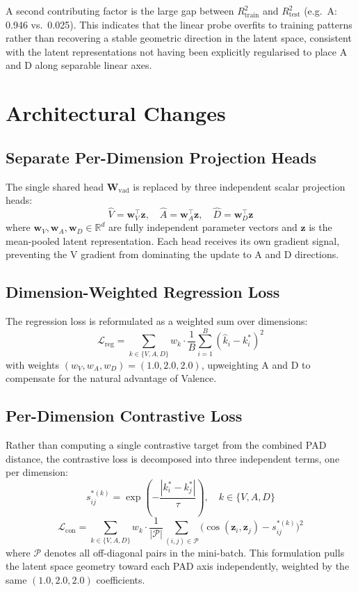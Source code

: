 \documentclass[12pt,twoside]{report}
\begin{document}
A second contributing factor is the large gap between $R^2_{\text{train}}$ and $R^2_{\text{test}}$ (e.g.\ A: 0.946 vs.\ 0.025).
This indicates that the linear probe overfits to training patterns rather than recovering a stable geometric direction in the latent space, consistent with the latent representations not having been explicitly regularised to place A and D along separable linear axes.

\section{Architectural Changes}

\subsection{Separate Per-Dimension Projection Heads}

The single shared head $\mathbf{W}_{\text{vad}}$ is replaced by three independent scalar projection heads:
\[
    \hat{V} = \mathbf{w}_V^\top \mathbf{z}, \quad
    \hat{A} = \mathbf{w}_A^\top \mathbf{z}, \quad
    \hat{D} = \mathbf{w}_D^\top \mathbf{z}
\]
where $\mathbf{w}_V, \mathbf{w}_A, \mathbf{w}_D \in \mathbb{R}^d$ are fully independent parameter vectors and $\mathbf{z}$ is the mean-pooled latent representation.
Each head receives its own gradient signal, preventing the V gradient from dominating the update to A and D directions.

\subsection{Dimension-Weighted Regression Loss}

The regression loss is reformulated as a weighted sum over dimensions:
\[
    \mathcal{L}_{\text{reg}} = \sum_{k \in \{V, A, D\}} w_k \cdot \frac{1}{B}\sum_{i=1}^{B}(\hat{k}_i - k_i^*)^2
\]
with weights $(w_V, w_A, w_D) = (1.0, 2.0, 2.0)$, upweighting A and D to compensate for the natural advantage of Valence.

\subsection{Per-Dimension Contrastive Loss}

Rather than computing a single contrastive target from the combined PAD distance, the contrastive loss is decomposed into three independent terms, one per dimension:
\[
    s_{ij}^{*(k)} = \exp\!\left(-\frac{|k_i^* - k_j^*|}{\tau}\right), \quad k \in \{V, A, D\}
\]
\[
    \mathcal{L}_{\text{con}} = \sum_{k \in \{V, A, D\}} w_k \cdot \frac{1}{|\mathcal{P}|}\sum_{(i,j) \in \mathcal{P}} \bigl(\cos(\mathbf{z}_i, \mathbf{z}_j) - s_{ij}^{*(k)}\bigr)^2
\]
where $\mathcal{P}$ denotes all off-diagonal pairs in the mini-batch.
This formulation pulls the latent space geometry toward each PAD axis independently, weighted by the same $(1.0, 2.0, 2.0)$ coefficients.
\end{document}
